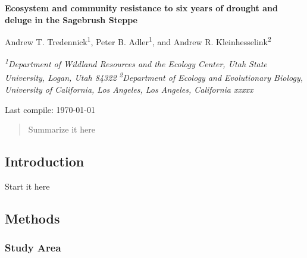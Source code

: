 \documentclass[12pt,]{article}
\title{}
\author{}
\date{}
\begin{document}
\renewcommand\linenumberfont{\normalfont\tiny\sffamily\color{gray}}

 \newcommand{\new}{\textcolor{blue}}

\begin{singlespace}

\begin{centering}

\Large{\textbf{Ecosystem and community resistance to six years of drought and deluge in the Sagebrush Steppe}}

\bigskip{} \bigskip{}

\renewcommand*{\thefootnote}{\fnsymbol{footnote}}

\normalsize{Andrew T. Tredennick\textsuperscript{1}, Peter B. Adler\textsuperscript{1}, and Andrew R. Kleinhesselink\textsuperscript{2}}

\bigskip{}

\textit{\small{\textsuperscript{1}Department of Wildland Resources and the Ecology Center, Utah State University, Logan, Utah 84322}}
\textit{\small{\textsuperscript{2}Department of Ecology and Evolutionary Biology, University of California, Los Angeles, Los Angeles, California xxxxx}}

\end{centering}

\vspace{3em}

Last compile: \today

\end{singlespace}

\begin{abstract}
Summarize it here
\vspace{2em}
\end{abstract}

\setlength{\parindent}{5ex}

\subsection{Introduction}\label{introduction}

Start it here

\subsection{Methods}\label{methods}

\subsubsection{Study Area}\label{study-area}
\end{document}

